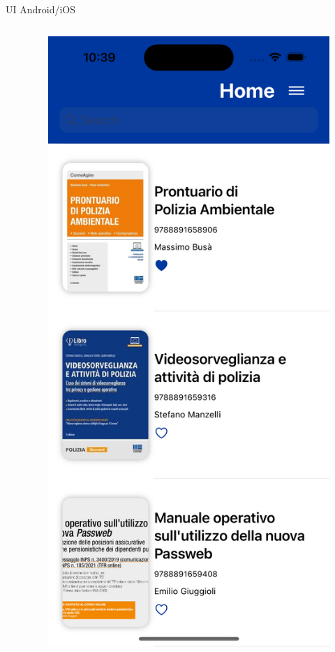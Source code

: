 \begin{frame}{UI Android/iOS}
\begin{columns}[onlytextwidth]
\begin{column}{0.14\textwidth}
        \end{column}
        \begin{column}{0.14\textwidth}
        
            \begin{figure}[H]
                \includegraphics[width=1\textwidth]{img/home_ios.png}
            \end{figure}
            

\end{column}
\end{columns}
\end{frame}

